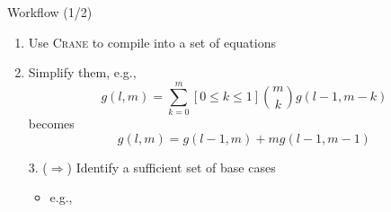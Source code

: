 \documentclass{beamer}
\newcommand{\Cranetwo}{\textsc{Crane2}}
\begin{document}




\begin{frame}{Workflow (1/2)}
  \begin{enumerate}
    \item Use \textsc{Crane} to compile \structure{$\phi$} into a set of
          equations  \pause
    \item Simplify them, e.g.,
          \[
            g(l, m) = \sum_{k=0}^{m}[0 \le k \le 1]\binom{m}{k}g(l-1, m-k)
          \]
          becomes
          \[
            g(l, m) = g(l-1, m) + mg(l-1, m-1)
          \] \pause
    \item[3. ($\Rightarrow$)] Identify a sufficient set of base cases
          \begin{itemize}
            \item e.g., 
          \end{itemize}
  \end{enumerate}
\end{frame}
\end{document}
